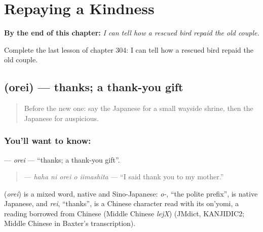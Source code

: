 
\chapter{Repaying a Kindness}
\label{ch:ja-repaying-a-kindness}

\begin{chapteropening}
\textbf{By the end of this chapter:} \emph{I can tell how a rescued bird repaid the old couple.}

Complete the last lesson of chapter 304: I can tell how a rescued bird repaid the old couple.
\end{chapteropening}

\section[\texorpdfstring{\ja{おれい} (orei)}{おれい (orei)}]{ (orei) — thanks; a thank-you gift}

\label{lesson:JA-C304-orei}



\begin{quote}
Before the new one: say the Japanese for a small wayside shrine, then the Japanese for auspicious.
\end{quote}

\subsection*{You'll want to know: }
\textbf{} — \emph{orei} — \textquotedblleft{}thanks; a thank-you gift\textquotedblright{}.

\begin{quote}
\textbf{  } — \emph{haha ni orei o iimashita} — \textquotedblleft{}I said thank you to my mother.\textquotedblright{}
\end{quote}

\begin{cousinweb}
\textbf{} (\emph{orei}) is a mixed word, native and Sino-Japanese: \emph{o-}, \textquotedblleft{}the polite prefix\textquotedblright{}, is native Japanese, and \emph{rei}, \textquotedblleft{}thanks\textquotedblright{}, is a Chinese character read with its on'yomi, a reading borrowed from Chinese (Middle Chinese \emph{lejX}) (JMdict, KANJIDIC2; Middle Chinese in Baxter's transcription).
\end{cousinweb}

